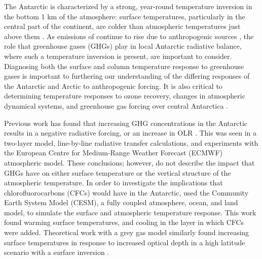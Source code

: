 \documentclass[draft]{agujournal2019}
\begin{document}
The Antarctic is characterized by a strong, year-round temperature inversion in the bottom 1 km of the atmosphere: surface temperatures, particularly in the central part of the continent, are colder than atmospheric temperatures just above them \cite{hudson_look_2005}. As emissions of  continue to rise due to anthropogenic sources \cite{peters_carbon_2020}, the role that greenhouse gases (GHGs) play in local Antarctic radiative balance, where such a temperature inversion is present, are important to consider. Diagnosing both the surface and column temperature response to greenhouse gases is important to furthering our understanding of the differing responses of the Antarctic and Arctic to anthropogenic forcing. It is also critical to determining temperature responses to ozone recovery, changes in atmospheric dynamical systems, and greenhouse gas forcing over central Antarctica \cite{shindell_southern_2004, thompson_signatures_2011}.

Previous work has found that increasing GHG concentrations in the Antarctic results in a negative radiative forcing, or an increase in OLR \cite{schmithusen_how_2015,huang_inhomogeneous_2016}. This was seen in a two-layer model, line-by-line radiative transfer calculations, and experiments with the European Centre for Medium-Range Weather Forecast (ECMWF) atmospheric model. These conclusions; however, do not describe the impact that GHGs have on either surface temperature or the vertical structure of the atmospheric temperature. In order to investigate the implications that chlorofluorocarbons (CFCs) would have in the Antarctic, \cite{flanner_climate_2018} used the Community Earth System Model (CESM), a fully coupled atmosphere, ocean, and land model, to simulate the surface and atmospheric temperature response. This work found warming surface temperatures, and cooling in the layer in which CFCs were added. Theoretical work with a grey gas model similarly found increasing surface temperatures in response to increased optical depth in a high latitude scenario with a surface inversion \cite{payne_conceptual_2015}.
\end{document}
